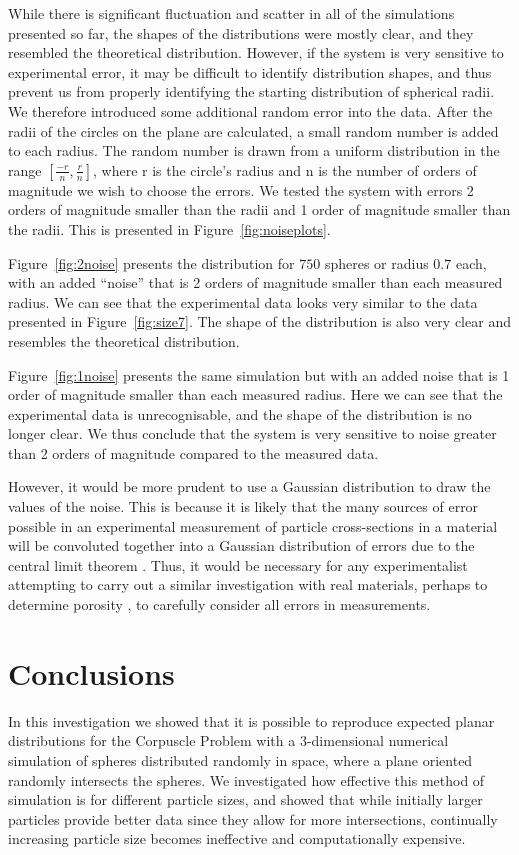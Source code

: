 \documentclass[journal]{IEEEtran}
\begin{document}
While there is significant fluctuation and scatter in all of the simulations
presented so far, the shapes of the distributions were mostly clear, and they
resembled the theoretical distribution. However, if the system is very sensitive
to experimental error, it may be difficult to identify distribution shapes, and
thus prevent us from properly identifying the starting distribution of spherical
radii. We therefore introduced some additional random error into the data. After
the radii of the circles on the plane are calculated, a small random number is
added to each radius. The random number is drawn from a uniform distribution in
the range $[\frac{-r}{n}, \frac{r}{n}]$, where r is the circle's radius and n is
the number of orders of magnitude we wish to choose the errors. We tested the
system with errors 2 orders of magnitude smaller than the radii and 1 order of
magnitude smaller than the radii. This is presented in
Figure~\ref{fig:noiseplots}. 


Figure~\ref{fig:2noise} presents the distribution for $750$ spheres or radius
$0.7$ each, with an added ``noise'' that is 2 orders of magnitude smaller than
each measured radius. We can see that the experimental data looks very similar
to the data presented in Figure~\ref{fig:size7}. The shape of the distribution
is also very clear and resembles the theoretical distribution.

Figure~\ref{fig:1noise} presents the same simulation but with an added noise
that is 1 order of magnitude smaller than each measured radius. Here we can see
that the experimental data is unrecognisable, and the shape of the distribution
is no longer clear. We thus conclude that the system is very sensitive to noise
greater than 2 orders of magnitude compared to the measured data.

However, it would be more prudent to use a Gaussian distribution to draw the
values of the noise. This is because it is likely that the many sources of error
possible in an experimental measurement of particle cross-sections in a material
will be convoluted together into a Gaussian distribution of errors due to the
central limit theorem \cite{Islam2018}. Thus, it would be necessary for any
experimentalist attempting to carry out a similar investigation with real
materials, perhaps to determine porosity \cite{Lekakh}, to carefully consider
all errors in measurements.

\section{Conclusions}
In this investigation we showed that it is possible to reproduce expected planar
distributions for the Corpuscle Problem with a 3-dimensional numerical
simulation of spheres distributed randomly in space, where a plane oriented
randomly intersects the spheres. We investigated how effective this method of
simulation is for different particle sizes, and showed that while initially
larger particles provide better data since they allow for more intersections,
continually increasing particle size becomes ineffective and computationally
expensive. 
\end{document}
